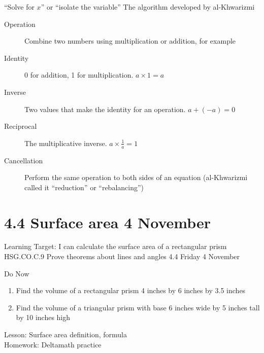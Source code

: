 \begin{frame}{``Solve for $x$'' or ``isolate the variable''}
  {The algorithm developed by al-Khwarizmi}
  \begin{description}
    \item[Operation] Combine two numbers using multiplication or addition, for example
    \item[Identity] 0 for addition, 1 for multiplication. $a \times 1 = a$
    \item[Inverse] Two values that make the identity for an operation. $a + (-a)=0$
    \item[Reciprocal] The multiplicative inverse. $a \times \frac{1}{a}=1$
    \item[Cancellation] Perform the same operation to both sides of an equation (al-Khwarizmi called it ``reduction'' or ``rebalancing'')
  \end{description}
\end{frame}

\section{4.4 Surface area \hfill 4 November \,}
  \begin{frame}{Learning Target: I can calculate the surface area of a rectangular prism}
    {HSG.CO.C.9 Prove theorems about lines and angles  \hfill \alert{4.4 Friday 4 November}}
    \begin{block}{Do Now}
      \begin{enumerate}
        \item Find the volume of a rectangular prism 4 inches by 6 inches by 3.5 inches
        \item Find the volume of a triangular prism with base 6 inches wide by 5 inches tall by 10 inches high
      \end{enumerate}
    \end{block}
      Lesson: Surface area definition, formula \\
      Homework: Deltamath practice
  \end{frame}


